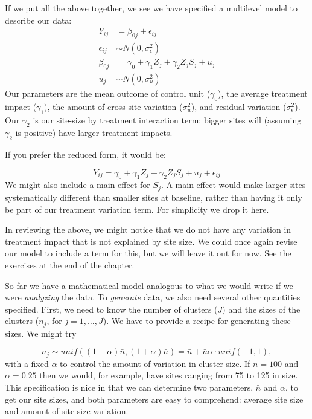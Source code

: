 \documentclass[
]{book}
\begin{document}
If we put all the above together, we see we have specified a multilevel model to describe our data:
\[
\begin{aligned}
Y_{ij} &= \beta_{0j} + \epsilon_{ij} \\
\epsilon_{ij} &\sim N( 0, \sigma^2_\epsilon ) \\
\beta_{0j} &= \gamma_{0} + \gamma_{1} Z_j + \gamma_2 Z_j S_j + u_j \\
u_j &\sim N( 0, \sigma^2_u )
\end{aligned}
\]
Our parameters are the mean outcome of control unit (\(\gamma_0\)), the average treatment impact (\(\gamma_1\)), the amount of cross site variation (\(\sigma^2_u\)), and residual variation (\(\sigma^2_\epsilon\)).
Our \(\gamma_2\) is our site-size by treatment interaction term: bigger sites will (assuming \(\gamma_2\) is positive) have larger treatment impacts.

If you prefer the reduced form, it would be:

\[ Y_{ij} = \gamma_{0} + \gamma_{1} Z_j + \gamma_2 Z_j S_j  + u_j + \epsilon_{ij}  \]
We might also include a main effect for \(S_j\).
A main effect would make larger sites systematically different than smaller sites at baseline, rather than having it only be part of our treatment variation term.
For simplicity we drop it here.

In reviewing the above, we might notice that we do not have any variation in treatment impact that is not explained by site size.
We could once again revise our model to include a term for this, but we will leave it out for now.
See the exercises at the end of the chapter.

So far we have a mathematical model analogous to what we would write if we were \emph{analyzing} the data.
To \emph{generate} data, we also need several other quantities specified.
First, we need to know the number of clusters (\(J\)) and the sizes of the clusters (\(n_j\), for \(j = 1, \ldots, J\)).
We have to provide a recipe for generating these sizes.
We might try

\[ n_j \sim unif( (1-\alpha)\bar{n}, (1+\alpha)\bar{n} ) = \bar{n} + \bar{n}\alpha \cdot unif(-1, 1) ,\]
with a fixed \(\alpha\) to control the amount of variation in cluster size.
If \(\bar{n} = 100\) and \(\alpha = 0.25\) then we would, for example, have sites ranging from 75 to 125 in size.
This specification is nice in that we can determine two parameters, \(\bar{n}\) and \(\alpha\), to get our site sizes, and both parameters are easy to comprehend: average site size and amount of site size variation.
\end{document}
